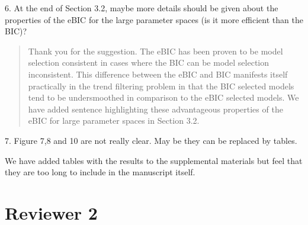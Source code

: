 \documentclass{article}
\newcommand{\V}[1]{{\bm{\mathbf{\MakeLowercase{#1}}}}} %
\newcommand{\M}[1]{{\bm{\mathbf{\MakeUppercase{#1}}}}} %
\newcommand{\Mn}[2]{\M{#1}^{(#2)}} %
\begin{document}
6. At the end of Section 3.2, maybe more details should be given about the properties of the eBIC for the large parameter spaces (is it more efficient than the BIC)?

\begin{quote}
Thank you for the suggestion. The eBIC has been proven to be model selection consistent in cases where the BIC can be model selection inconsistent. This difference between the eBIC and BIC manifests itself practically in the trend filtering problem in that the BIC selected models tend to be undersmoothed in comparison to the eBIC selected models. We have added sentence highlighting these advantageous properties of the eBIC for large parameter spaces in Section 3.2.


\end{quote}

7. Figure 7,8 and 10 are not really clear. May be they can be replaced by tables.

We have added tables with the results to the supplemental materials but feel that they are too long to include in the manuscript itself. 

\section*{Reviewer 2}
\end{document}
